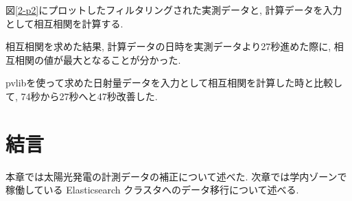 図\ref{2-p2}にプロットしたフィルタリングされた実測データと, 計算データを入力として相互相関を計算する.

相互相関を求めた結果, 計算データの日時を実測データより27秒進めた際に, 相互相関の値が最大となることが分かった.

pvlibを使って求めた日射量データを入力として相互相関を計算した時と比較して, 74秒から27秒へと47秒改善した.

\section{結言}
本章では太陽光発電の計測データの補正について述べた. 
次章では学内ゾーンで稼働している Elasticsearch クラスタへのデータ移行について述べる.